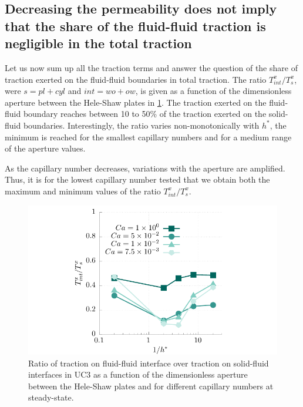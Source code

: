 \documentclass[]{article}
\begin{document}
\hypertarget{decreasing-the-permeability-does-not-imply-that-the-share-of-the-fluid-fluid-traction-is-negligible-in-the-total-traction}{%
\subsection{Decreasing the permeability does not imply that the share of
the fluid-fluid traction is negligible in the total
traction}\label{decreasing-the-permeability-does-not-imply-that-the-share-of-the-fluid-fluid-traction-is-negligible-in-the-total-traction}}

Let us now sum up all the traction terms and answer the question of the
share of traction exerted on the fluid-fluid boundaries in total
traction. The ratio \(T_{int}^x/T_{s}^x\), were \(s={pl+cyl}\) and
\(int={wo+ow}\), is given as a function of the dimensionless aperture
between the Hele-Shaw plates in \cref{fig:ratioDrag}. The traction
exerted on the fluid-fluid boundary reaches between 10 to 50\% of the
traction exerted on the solid-fluid boundaries. Interestingly, the ratio
varies non-monotonically with \(h^*\), the minimum is reached for the
smallest capillary numbers and for a medium range of the aperture
values.

As the capillary number decreases, variations with the aperture are
amplified. Thus, it is for the lowest capillary number tested that we
obtain both the maximum and minimum values of the ratio
\(T_{int}^x/T_{s}^x\).

\begin{figure}
\hypertarget{fig:ratioDrag}{%
\centering
\includegraphics{figures/pdf/ratioDrag.pdf}
\caption{Ratio of traction on fluid-fluid interface over traction on
solid-fluid interfaces in UC3 as a function of the dimensionless
aperture between the Hele-Shaw plates and for different capillary
numbers at steady-state.}\label{fig:ratioDrag}
}
\end{figure}
\end{document}
